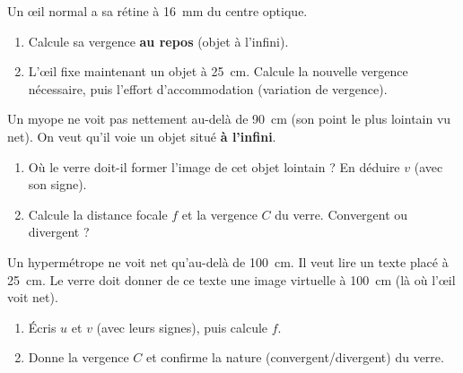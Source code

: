 \documentclass[11pt,a4paper]{article}
\begin{document}

\begin{exo}
Un \oe il normal a sa rétine à \qty{16}{\mm} du centre optique.
\begin{enumerate}[label=\alph*)]
  \item Calcule sa vergence \textbf{au repos} (objet à l'infini).
  \item L'\oe il fixe maintenant un objet à \qty{25}{\cm}. Calcule la nouvelle vergence nécessaire,
        puis l'effort d'accommodation (variation de vergence).
\end{enumerate}
\end{exo}

\begin{exo}
Un myope ne voit pas nettement au-delà de \qty{90}{\cm} (son point le plus lointain vu net). On veut
qu'il voie un objet situé \textbf{à l'infini}.
\begin{enumerate}[label=\alph*)]
  \item Où le verre doit-il former l'image de cet objet lointain ? En déduire $v$ (avec son signe).
  \item Calcule la distance focale $f$ et la vergence $C$ du verre. Convergent ou divergent ?
\end{enumerate}
\end{exo}

\begin{exo}
Un hypermétrope ne voit net qu'au-delà de \qty{100}{\cm}. Il veut lire un texte placé à \qty{25}{\cm}.
Le verre doit donner de ce texte une image virtuelle à \qty{100}{\cm} (là où l'\oe il voit net).
\begin{enumerate}[label=\alph*)]
  \item Écris $u$ et $v$ (avec leurs signes), puis calcule $f$.
  \item Donne la vergence $C$ et confirme la nature (convergent/divergent) du verre.
\end{enumerate}
\end{exo}
\end{document}
